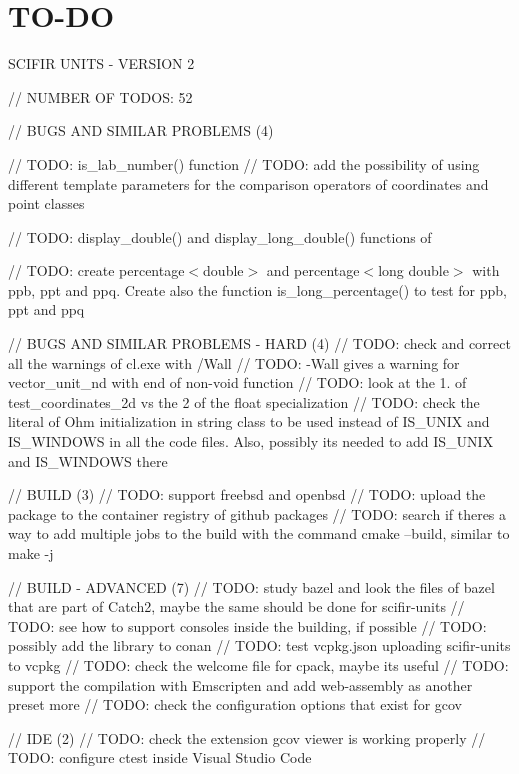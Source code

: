 \chapter{TO-\/\+DO}
\hypertarget{md_TO-DO}{}\label{md_TO-DO}
SCIFIR UNITS -\/ VERSION 2

// NUMBER OF TODOS\+: 52

// BUGS AND SIMILAR PROBLEMS (4)

// TODO\+: is\+\_\+lab\+\_\+number() function // TODO\+: add the possibility of using different template parameters for the comparison operators of coordinates and point classes

// TODO\+: display\+\_\+double() and display\+\_\+long\+\_\+double() functions of 

// TODO\+: create percentage$<$double$>$ and percentage$<$long double$>$ with ppb, ppt and ppq. Create also the function is\+\_\+long\+\_\+percentage() to test for ppb, ppt and ppq

// BUGS AND SIMILAR PROBLEMS -\/ HARD (4) // TODO\+: check and correct all the warnings of cl.\+exe with /\+Wall // TODO\+: -\/Wall gives a warning for vector\+\_\+unit\+\_\+nd with end of non-\/void function // TODO\+: look at the 1. of test\+\_\+coordinates\+\_\+2d vs the 2 of the float specialization // TODO\+: check the literal of Ohm initialization in string class to be used instead of IS\+\_\+\+UNIX and IS\+\_\+\+WINDOWS in all the code files. Also, possibly it\textquotesingle{}s needed to add IS\+\_\+\+UNIX and IS\+\_\+\+WINDOWS there

// BUILD (3) // TODO\+: support freebsd and openbsd // TODO\+: upload the package to the container registry of github packages // TODO\+: search if there\textquotesingle{}s a way to add multiple jobs to the build with the command cmake --build, similar to make -\/j

// BUILD -\/ ADVANCED (7) // TODO\+: study bazel and look the files of bazel that are part of Catch2, maybe the same should be done for scifir-\/units // TODO\+: see how to support consoles inside the building, if possible // TODO\+: possibly add the library to conan // TODO\+: test vcpkg.\+json uploading scifir-\/units to vcpkg // TODO\+: check the welcome file for cpack, maybe it\textquotesingle{}s useful // TODO\+: support the compilation with Emscripten and add web-\/assembly as another preset more // TODO\+: check the configuration options that exist for gcov

// IDE (2) // TODO\+: check the extension gcov viewer is working properly // TODO\+: configure ctest inside Visual Studio Code


